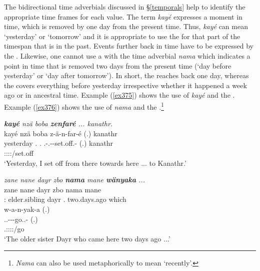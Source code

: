 The bidirectional time adverbials discussed in \S{}\ref{temporals} help to identify the appropriate time frames for each  value. The term \emph{kayé} expresses a moment in time, which is removed by one day from the present time. Thus, \emph{kayé} can mean `yesterday' or `tomorrow' and it is appropriate to use the  for that part of the timespan that is in the past. Events further back in time have to be expressed by the  . Likewise, one cannot use a  with the time adverbial \emph{nama} which indicates a point in time that is removed two days from the present time (`day before yesterday' or `day after tomorrow'). In short, the  reaches back one day, whereas the   covers everything before yesterday irrespective whether it happened a week ago or in ancestral time. Example (\ref{ex375}) shows the use of \emph{kayé} and the . Example (\ref{ex376}) shows the use of \emph{nama} and the  .\footnote{\emph{Nama} can also be used metaphorically to mean `recently'.}

\begin{exe}
  	\ex \emph{\textbf{kayé} nzä boba \textbf{zenfaré} ... kanathr.}\\
  	\glll kayé nzä boba z-ä-n-far-é (.) kanathr\\
	yesterday \Fsg.\Abs{} \Med.\Abl{} \M.\Gam-\Vc.\Ndu-\Venit-set.off.\Ext-\Fsg{} (.) kanathr\\
 	{} {} {} \footnotesize{\Fsg:\Sbj:\Rpst:\Pfv:\Venit/set.off} {} {}\\
  	\trans `Yesterday, I set off from there towards here ... to Kanathr.'\\ 
  	\label{ex375}
\end{exe}
\begin{exe}
	\ex \emph{zane nane dayr zbo \textbf{nama} mane \textbf{wänyaka} ...}\\
	\gll zane nane dayr zbo nama mane\\
	\Dem:\Prox{} elder.sibling dayr \Prox.\All{} two.days.ago which\\
	\sn
	\glll w-a-n-yak-a (.)\\
	\Tsg.\F.\Alph-\Vc-\Venit-go.\Ext.\Ndu-\Pst{} (.)\\
	\footnotesize{\Tsg.\F:\Sbj:\Pst:\Ipfv:\Venit/go} {}\\
	\trans `The older sister Dayr who came here two days ago ...'\\ 
	\label{ex376}
\end{exe}

